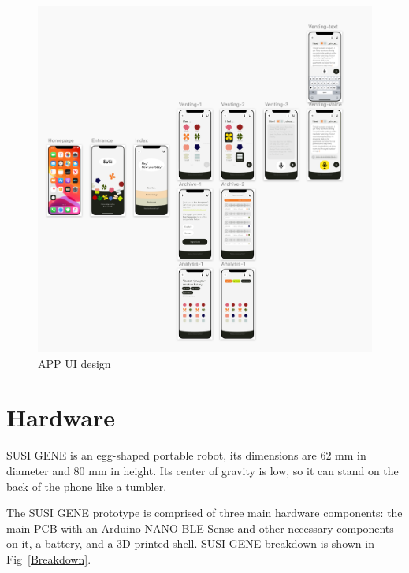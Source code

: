\documentclass[manuscript,screen]{acmart}
\begin{document}
\begin{figure}[h]
  \centering
  \includegraphics[width=\linewidth]{APP.png}
  \caption{APP UI design}
  \label{APP}
\end{figure}

\section{Hardware}

SUSI GENE is an egg-shaped portable robot, its dimensions are 62 mm in diameter and 80 mm in height. Its center of gravity is low, so it can stand on the back of the phone like a tumbler.

The SUSI GENE prototype is comprised of three main hardware components: the main PCB with an Arduino NANO BLE Sense and other necessary components on it, a battery, and a 3D printed shell. SUSI GENE breakdown is shown in Fig~\ref{Breakdown}.
\end{document}
